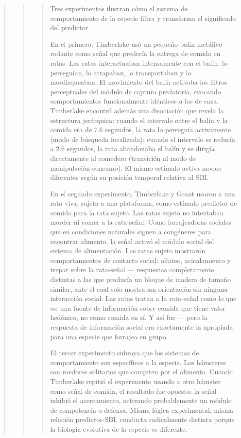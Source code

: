 \documentclass[
  letterpaper,
  DIV=11,
  numbers=noendperiod]{scrreprt}
\begin{document}
\begin{tcolorbox}[enhanced jigsaw, toprule=.15mm, arc=.35mm, colback=white, opacityback=0, colframe=quarto-callout-note-color-frame, breakable, rightrule=.15mm, left=2mm, leftrule=.75mm, bottomrule=.15mm]
\begin{quote}
\begin{quote}
\begin{quote}
Tres experimentos ilustran cómo el sistema de comportamiento de la
especie filtra y transforma el significado del predictor.

En el primero, Timberlake usó un pequeño balín metálico rodante como
señal que predecía la entrega de comida en ratas. Las ratas
interactuaban intensamente con el balín: lo perseguían, lo atrapaban, lo
transportaban y lo mordisqueaban. El movimiento del balín activaba los
filtros perceptuales del módulo de captura predatoria, evocando
comportamientos funcionalmente idénticos a los de caza. Timberlake
encontró además una disociación que revela la estructura jerárquica:
cuando el intervalo entre el balín y la comida era de 7.6 segundos, la
rata lo perseguía activamente (modo de búsqueda focalizada); cuando el
intervalo se reducía a 2.6 segundos, la rata abandonaba el balín y se
dirigía directamente al comedero (transición al modo de
manipulación-consumo). El mismo estímulo activa modos diferentes según
su posición temporal relativa al SBI.

En el segundo experimento, Timberlake y Grant usaron a una rata viva,
sujeta a una plataforma, como estímulo predictor de comida para la rata
sujeto. Las ratas sujeto no intentaban morder ni comer a la rata-señal.
Como forrajeadoras sociales que en condiciones naturales siguen a
congéneres para encontrar alimento, la señal activó el módulo social del
sistema de alimentación. Las ratas sujeto mostraron comportamientos de
contacto social: olfateo, acicalamiento y trepar sobre la rata-señal ---
respuestas completamente distintas a las que producía un bloque de
madera de tamaño similar, ante el cual solo mostraban orientación sin
ninguna interacción social. Las ratas tratan a la rata-señal como lo que
es: una fuente de información sobre comida que tiene valor hedónico, no
como comida en sí. Y así fue --- pero la respuesta de información social
era exactamente la apropiada para una especie que forrajea en grupo.

El tercer experimento subraya que los sistemas de comportamiento son
específicos a la especie. Los hámsteres son roedores solitarios que
compiten por el alimento. Cuando Timberlake repitió el experimento
usando a otro hámster como señal de comida, el resultado fue opuesto: la
señal inhibió el acercamiento, activando probablemente un módulo de
competencia o defensa. Misma lógica experimental, misma relación
predictor-SBI, conducta radicalmente distinta porque la biología
evolutiva de la especie es diferente.


\end{quote}
\end{quote}
\end{quote}
\end{tcolorbox}
\end{document}

